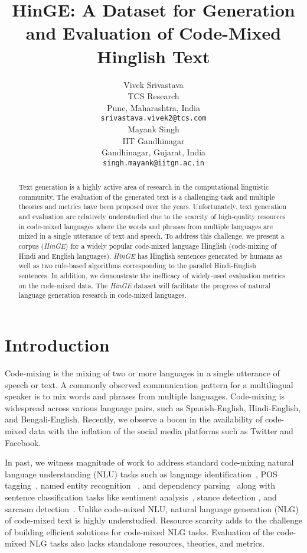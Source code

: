 \documentclass[11pt]{article}
\title{HinGE: A Dataset for Generation and Evaluation of Code-Mixed Hinglish Text}
\author{Vivek Srivastava \\
  TCS Research\\ Pune, Maharashtra, India \\
  \texttt{srivastava.vivek2@tcs.com} \\\And
  Mayank Singh \\
  IIT Gandhinagar\\ Gandhinagar, Gujarat, India \\
  \texttt{singh.mayank@iitgn.ac.in} \\}
\begin{document}

\maketitle
\setcounter{page}{1}
\begin{abstract}
Text generation is a highly active area of research in the computational linguistic community. The evaluation of the generated text is a challenging task and multiple theories and metrics have been proposed over the years. Unfortunately, text generation and evaluation are relatively understudied due to the scarcity of high-quality resources in code-mixed languages where the words and phrases from multiple languages are mixed in a single utterance of text and speech. To address this challenge, we present a corpus (\textit{HinGE}) for a widely popular code-mixed language Hinglish (code-mixing of Hindi and English languages). \textit{HinGE} has Hinglish sentences generated by humans as well as two rule-based algorithms corresponding to the parallel Hindi-English sentences. In addition, we demonstrate the inefficacy of widely-used evaluation metrics on the code-mixed data. The \textit{HinGE} dataset will facilitate the progress of natural language generation research in code-mixed languages.  
\end{abstract}

\section{Introduction}
Code-mixing is the mixing of two or more languages in a single utterance of speech or text. A commonly observed communication pattern for a multilingual speaker is to mix words and phrases from multiple languages. Code-mixing is widespread across various language pairs, such as Spanish-English, Hindi-English, and Bengali-English. Recently, we observe a boom in the availability of code-mixed data with the inflation of the social media platforms such as Twitter and Facebook. 

In past, we witness magnitude of work to address standard code-mixing natural language understanding (NLU) tasks such as language identification~\cite{shekhar2020language,singh2018language, ramanarayanan2019automatic}, POS tagging~\cite{singh2018twitter,vyas2014pos}, named entity recognition ~\cite{singh2018language}, and dependency parsing~\cite{zhang2019cross} along with sentence classification tasks like sentiment analysis~\cite{patwa2020semeval, joshi2016towards}, stance detection \cite{10.1145/3371158.3371226}, and sarcasm detection~\cite{swami2018corpus}. Unlike code-mixed NLU, natural language generation (NLG) of code-mixed text is highly understudied. Resource scarcity adds to the challenge of building efficient solutions for code-mixed NLG tasks. Evaluation of the code-mixed NLG tasks also lacks standalone resources, theories, and metrics.  
\end{document}
